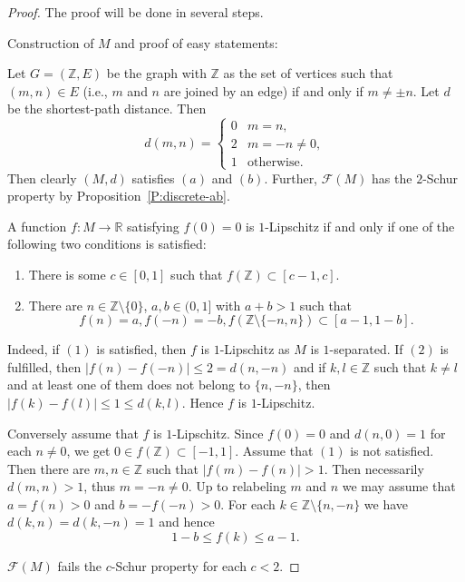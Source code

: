 \documentclass{amsart}
\numberwithin{equation}{section}
\theoremstyle{definition}
\def\F{\mathcal F}
\def\er{\mathbb R}
\def\zet{\mathbb Z}
\newcommand{\abs}[1]{\left|#1\right|}
\begin{document}
\begin{proof} The proof will be done in several steps.

\smallskip

 Construction of $M$ and proof of easy statements:

\smallskip

 Let $G=(\zet,E)$ be the graph with $\zet$ as the set of vertices such that $(m,n)\in E$ (i.e., $m$ and $n$ are joined by an edge) if and only if $m\ne\pm n$. Let $d$ be the shortest-path distance. Then
 $$d(m,n)=\begin{cases} 0 & m=n, \\ 2 & m=-n\ne0,\\ 1 &\mbox{otherwise}.\end{cases}$$
Then clearly $(M,d)$ satisfies $(a)$ and $(b)$. Further, $\F(M)$ has the $2$-Schur property by Proposition~\ref{P:discrete-ab}.

\smallskip

 A function $f:M\to\er$ satisfying $f(0)=0$ is $1$-Lipschitz if and only if one of the following two conditions is satisfied:
\begin{enumerate}[$(1)$]
    \item There is some $c\in [0,1]$ such that $f(\zet)\subset [c-1,c]$.
    \item There are $n\in\zet\setminus\{0\}$, $a,b\in (0,1]$ with $a+b>1$ such that
    $$f(n)=a,f(-n)=-b,f(\zet\setminus\{-n,n\})\subset [a-1,1-b].$$ 
\end{enumerate}

\smallskip

Indeed, if $(1)$ is satisfied, then $f$ is $1$-Lipschitz as $M$ is $1$-separated. If $(2)$ is fulfilled,
then $\abs{f(n)-f(-n)}\le 2=d(n,-n)$ and if $k,l\in \zet$ such that  $k\ne l$ and at least one of them does not belong to $\{n,-n\}$, then $\abs{f(k)-f(l)}\le 1\le d(k,l)$. Hence $f$ is $1$-Lipschitz.

Conversely assume that $f$ is $1$-Lipschitz. Since $f(0)=0$ and $d(n,0)=1$ for each $n\ne 0$, we get
$0\in f(\zet)\subset [-1,1]$. Assume that $(1)$ is not satisfied. Then there are $m,n\in\zet$ such that $\abs{f(m)-f(n)}>1$. Then necessarily $d(m,n)>1$, thus $m=-n\ne0$. Up to relabeling $m$ and $n$ we may assume that $a=f(n)>0$ and $b=-f(-n)>0$. For each $k\in \zet\setminus\{n,-n\}$ we have $d(k,n)=d(k,-n)=1$ and hence
$$1-b\le f(k)\le a-1.$$

\smallskip

 $\F(M)$ fails the $c$-Schur property for each $c<2$.


\end{proof}
\end{document}
